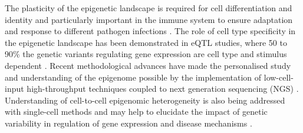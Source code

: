 The plasticity of the epigenetic landscape is required for cell differentiation and identity and particularly important in the immune system to ensure adaptation and response to different pathogen infections \parencite{Yosef2016}. The role of cell type specificity in the epigenetic landscape has been demonstrated in eQTL studies, where 50 to 90\% the genetic variants regulating gene expression are cell type and stimulus dependent \parencite{Dimas2009,Nica2011,Fairfax2012,Fairfax2014,Raj2014,Naranbhai2015,Kasela2017}. Recent methodological advances have made the personalised study and understanding of the epigenome possible by the implementation of low-cell-input high-throughput techniques coupled to next generation sequencing (NGS) \parencite{Buenrostro2013, Schmidl2016,Oudelaar2017}. Understanding of cell-to-cell epigenomic heterogeneity is also being addressed with single-cell methods and may help to elucidate the impact of genetic variability in regulation of gene expression and disease mechanisms \parencite{Buenrostro2015, Cusanovich2015,Rotem2015,Nagano2013,Smallwood2014}.




